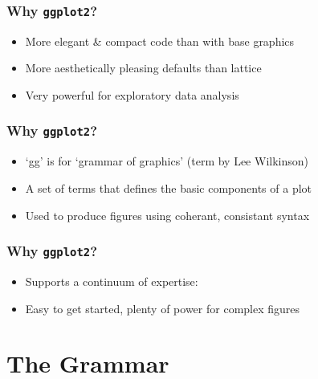 \documentclass{beamer}\usepackage[]{graphicx}\usepackage[]{color}
\begin{document}

\begin{frame}[fragile]
\frametitle{Why \texttt{ggplot2}?}
\begin{itemize}
\item More elegant \& compact code than with base graphics\\
\item More aesthetically pleasing defaults than lattice\\
\item Very powerful for exploratory data analysis\\
\end{itemize}
\end{frame}


\begin{frame}[fragile]
\frametitle{Why \texttt{ggplot2}?}
\begin{itemize}
\item `gg' is for `grammar of graphics' (term by Lee Wilkinson)\\
\item A set of terms that defines the basic components of a plot\\
\item Used to produce figures using coherant, consistant syntax\\
\end{itemize}
\end{frame}


\begin{frame}[fragile]
\frametitle{Why \texttt{ggplot2}?}
\begin{itemize}
\item Supports a continuum of expertise:
\item Easy to get started, plenty of power for complex figures 
\end{itemize}
\end{frame}


\section*{The Grammar}
\frame{\sectionpage}
\end{document}
